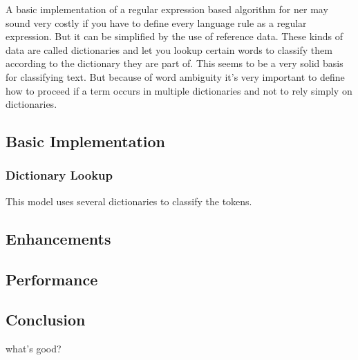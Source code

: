 A basic implementation of a regular expression based algorithm for \acrlong{ner} may sound very costly if you have to define every language rule
as a regular expression. But it can be simplified by the use of reference data. These kinds of data are called dictionaries and let you lookup
certain words to classify them according to the dictionary they are part of. This seems to be a very solid basis for classifying text. But because
of word ambiguity it's very important to define how to proceed if a term occurs in multiple dictionaries and not to rely simply on dictionaries.

\subsection{Basic Implementation}



\subsubsection{Dictionary Lookup}

This model uses several dictionaries to classify the tokens.

\subsection{Enhancements}

\subsection{Performance}

\subsection{Conclusion}

what's good?

